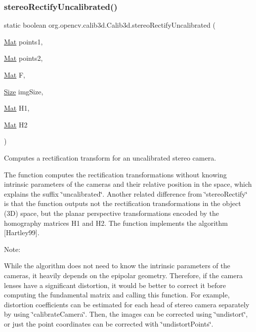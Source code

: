\subsubsection{\texorpdfstring{stereo\+Rectify\+Uncalibrated()}{stereoRectifyUncalibrated()}\hspace{0.1cm}{\footnotesize\ttfamily [2/2]}}
{\footnotesize\ttfamily static boolean org.\+opencv.\+calib3d.\+Calib3d.\+stereo\+Rectify\+Uncalibrated (\begin{DoxyParamCaption}\item[{\mbox{\hyperlink{classorg_1_1opencv_1_1core_1_1_mat}{Mat}}}]{points1,  }\item[{\mbox{\hyperlink{classorg_1_1opencv_1_1core_1_1_mat}{Mat}}}]{points2,  }\item[{\mbox{\hyperlink{classorg_1_1opencv_1_1core_1_1_mat}{Mat}}}]{F,  }\item[{\mbox{\hyperlink{classorg_1_1opencv_1_1core_1_1_size}{Size}}}]{img\+Size,  }\item[{\mbox{\hyperlink{classorg_1_1opencv_1_1core_1_1_mat}{Mat}}}]{H1,  }\item[{\mbox{\hyperlink{classorg_1_1opencv_1_1core_1_1_mat}{Mat}}}]{H2 }\end{DoxyParamCaption})\hspace{0.3cm}{\ttfamily [static]}}

Computes a rectification transform for an uncalibrated stereo camera.

The function computes the rectification transformations without knowing intrinsic parameters of the cameras and their relative position in the space, which explains the suffix \char`\"{}uncalibrated\char`\"{}. Another related difference from \char`\"{}stereo\+Rectify\char`\"{} is that the function outputs not the rectification transformations in the object (3D) space, but the planar perspective transformations encoded by the homography matrices {\ttfamily H1} and {\ttfamily H2}. The function implements the algorithm \mbox{[}Hartley99\mbox{]}.

Note\+:

While the algorithm does not need to know the intrinsic parameters of the cameras, it heavily depends on the epipolar geometry. Therefore, if the camera lenses have a significant distortion, it would be better to correct it before computing the fundamental matrix and calling this function. For example, distortion coefficients can be estimated for each head of stereo camera separately by using \char`\"{}calibrate\+Camera\char`\"{}. Then, the images can be corrected using \char`\"{}undistort\char`\"{}, or just the point coordinates can be corrected with \char`\"{}undistort\+Points\char`\"{}.


